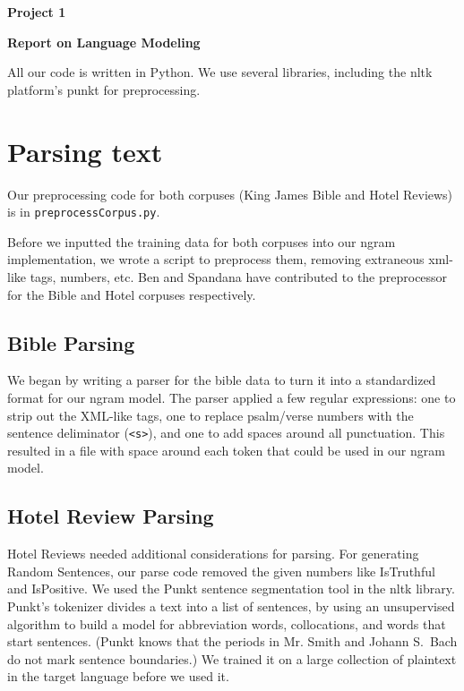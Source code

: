 \documentclass{article}
\begin{document}
\begin{center}\textbf{Project 1}\end{center}
\begin{center}\textbf{Report on Language Modeling}\end{center}

All our code is written in Python. We use several libraries, including the nltk platform's punkt for preprocessing.\par

\section{Parsing text}
Our preprocessing code for both corpuses (King James Bible and Hotel Reviews) is in \texttt{preprocessCorpus.py}.\par

Before we inputted the training data for both corpuses into our ngram implementation, we wrote a script to preprocess them, removing extraneous xml-like tags, numbers, etc. Ben and Spandana have contributed to the preprocessor for the Bible and Hotel corpuses respectively.\par

\subsection{Bible Parsing}

We began by writing a parser for the bible data to turn it into a standardized format for our ngram model. The parser applied a few regular expressions: one to strip out the XML-like tags, one to replace psalm/verse numbers with the sentence deliminator (\texttt{<s>}), and one to add spaces around all punctuation. This resulted in a file with space around each token that could be used in our ngram model. 

\subsection{Hotel Review Parsing}

Hotel Reviews needed additional considerations for parsing. For generating Random Sentences, our parse code removed the given numbers like IsTruthful and IsPositive. We used the Punkt sentence segmentation tool in the nltk library. Punkt's tokenizer divides a text into a list of sentences, by using an unsupervised algorithm to build a model for abbreviation words, collocations, and words that start sentences. (Punkt knows that the periods in Mr. Smith and Johann S.\ Bach do not mark sentence boundaries.) We trained it on a large collection of plaintext in the target language before we used it.
\end{document}
